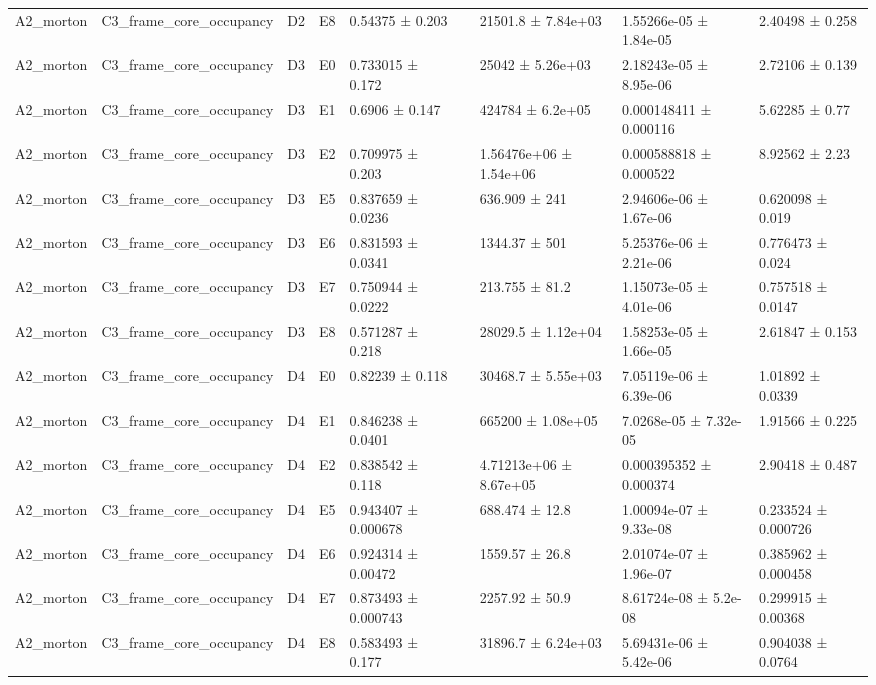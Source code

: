 \begin{table}
\begin{tabular}{lllllllll}
A2\_morton & C3\_frame\_core\_occupancy & D2 & E8 & 0.54375 ± 0.203 &  & 21501.8 ± 7.84e+03 & 1.55266e-05 ± 1.84e-05 & 2.40498 ± 0.258 \\
A2\_morton & C3\_frame\_core\_occupancy & D3 & E0 & 0.733015 ± 0.172 &  & 25042 ± 5.26e+03 & 2.18243e-05 ± 8.95e-06 & 2.72106 ± 0.139 \\
A2\_morton & C3\_frame\_core\_occupancy & D3 & E1 & 0.6906 ± 0.147 &  & 424784 ± 6.2e+05 & 0.000148411 ± 0.000116 & 5.62285 ± 0.77 \\
A2\_morton & C3\_frame\_core\_occupancy & D3 & E2 & 0.709975 ± 0.203 &  & 1.56476e+06 ± 1.54e+06 & 0.000588818 ± 0.000522 & 8.92562 ± 2.23 \\
A2\_morton & C3\_frame\_core\_occupancy & D3 & E5 & 0.837659 ± 0.0236 &  & 636.909 ± 241 & 2.94606e-06 ± 1.67e-06 & 0.620098 ± 0.019 \\
A2\_morton & C3\_frame\_core\_occupancy & D3 & E6 & 0.831593 ± 0.0341 &  & 1344.37 ± 501 & 5.25376e-06 ± 2.21e-06 & 0.776473 ± 0.024 \\
A2\_morton & C3\_frame\_core\_occupancy & D3 & E7 & 0.750944 ± 0.0222 &  & 213.755 ± 81.2 & 1.15073e-05 ± 4.01e-06 & 0.757518 ± 0.0147 \\
A2\_morton & C3\_frame\_core\_occupancy & D3 & E8 & 0.571287 ± 0.218 &  & 28029.5 ± 1.12e+04 & 1.58253e-05 ± 1.66e-05 & 2.61847 ± 0.153 \\
A2\_morton & C3\_frame\_core\_occupancy & D4 & E0 & 0.82239 ± 0.118 &  & 30468.7 ± 5.55e+03 & 7.05119e-06 ± 6.39e-06 & 1.01892 ± 0.0339 \\
A2\_morton & C3\_frame\_core\_occupancy & D4 & E1 & 0.846238 ± 0.0401 &  & 665200 ± 1.08e+05 & 7.0268e-05 ± 7.32e-05 & 1.91566 ± 0.225 \\
A2\_morton & C3\_frame\_core\_occupancy & D4 & E2 & 0.838542 ± 0.118 &  & 4.71213e+06 ± 8.67e+05 & 0.000395352 ± 0.000374 & 2.90418 ± 0.487 \\
A2\_morton & C3\_frame\_core\_occupancy & D4 & E5 & 0.943407 ± 0.000678 &  & 688.474 ± 12.8 & 1.00094e-07 ± 9.33e-08 & 0.233524 ± 0.000726 \\
A2\_morton & C3\_frame\_core\_occupancy & D4 & E6 & 0.924314 ± 0.00472 &  & 1559.57 ± 26.8 & 2.01074e-07 ± 1.96e-07 & 0.385962 ± 0.000458 \\
A2\_morton & C3\_frame\_core\_occupancy & D4 & E7 & 0.873493 ± 0.000743 &  & 2257.92 ± 50.9 & 8.61724e-08 ± 5.2e-08 & 0.299915 ± 0.00368 \\
A2\_morton & C3\_frame\_core\_occupancy & D4 & E8 & 0.583493 ± 0.177 &  & 31896.7 ± 6.24e+03 & 5.69431e-06 ± 5.42e-06 & 0.904038 ± 0.0764 \\

\end{tabular}
\end{table}
